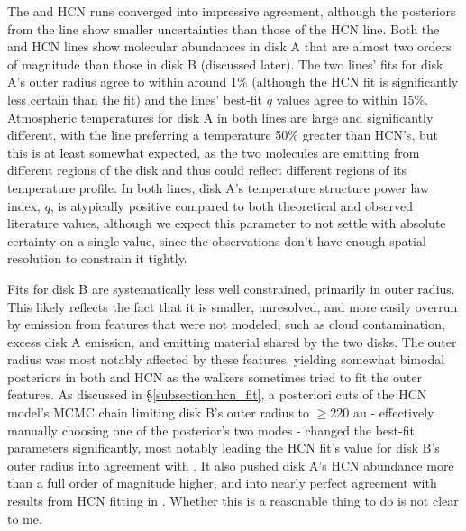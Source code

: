 The \hco and HCN runs converged into impressive agreement, although the posteriors from the \hco line show smaller uncertainties than those of the HCN line. Both the \hco and HCN lines show molecular abundances in disk A that are almost two orders of magnitude than those in disk B (discussed later). The two lines' fits for disk A's outer radius agree to within around 1\% (although the HCN fit is significantly less certain than the \hco fit) and the lines' best-fit $q$ values agree to within 15\%. Atmospheric temperatures for disk A in both lines are large and significantly different, with the \hco line preferring a temperature 50\% greater than HCN's, but this is at least somewhat expected, as the two molecules are emitting from different regions of the disk and thus could reflect different regions of its temperature profile. In both lines, disk A's temperature structure power law index, $q$, is atypically positive compared to both theoretical and observed literature values, although we expect this parameter to not settle with absolute certainty on a single value, since the observations don't have enough spatial resolution to constrain it tightly.


Fits for disk B are systematically less well constrained, primarily in outer radius. This likely reflects the fact that it is smaller, unresolved, and more easily overrun by emission from features that were not modeled, such as cloud contamination, excess disk A emission, and emitting material shared by the two disks. The outer radius was most notably affected by these features, yielding somewhat bimodal posteriors in both \hco and HCN as the walkers sometimes tried to fit the outer features. As discussed in \S\ref{subsection:hcn_fit}, a posteriori cuts of the HCN model's MCMC chain limiting disk B's outer radius to $\geq$220 au - effectively manually choosing one of the posterior's two modes -  changed the best-fit parameters significantly, most notably leading the HCN fit's value for disk B's outer radius into agreement with \hco. It also pushed disk A's HCN abundance more than a full order of magnitude higher, and into nearly perfect agreement with results from HCN fitting in \citet{Factor2017}. Whether this is a reasonable thing to do is not clear to me.






